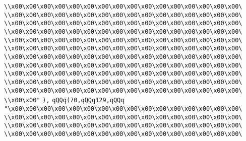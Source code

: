\verb|\\x00\x00\x00\x00\x00\x00\x00\x00\x00\x00\x00\x00\x00\x00\x00\x00\|\newline
\verb|\\x00\x00\x00\x00\x00\x00\x00\x00\x00\x00\x00\x00\x00\x00\x00\x00\|\newline
\verb|\\x00\x00\x00\x00\x00\x00\x00\x00\x00\x00\x00\x00\x00\x00\x00\x00\|\newline
\verb|\\x00\x00\x00\x00\x00\x00\x00\x00\x00\x00\x00\x00\x00\x00\x00\x00\|\newline
\verb|\\x00\x00\x00\x00\x00\x00\x00\x00\x00\x00\x00\x00\x00\x00\x00\x00\|\newline
\verb|\\x00\x00\x00\x00\x00\x00\x00\x00\x00\x00\x00\x00\x00\x00\x00\x00\|\newline
\verb|\\x00\x00\x00\x00\x00\x00\x00\x00\x00\x00\x00\x00\x00\x00\x00\x00\|\newline
\verb|\\x00\x00\x00\x00\x00\x00\x00\x00\x00\x00\x00\x00\x00\x00\x00\x00\|\newline
\verb|\\x00\x00\x00\x00\x00\x00\x00\x00\x00\x00\x00\x00\x00\x00\x00\x00\|\newline
\verb|\\x00\x00\x00\x00\x00\x00\x00\x00\x00\x00\x00\x00\x00\x00\x00\x00\|\newline
\verb|\\x00\x00\x00\x00\x00\x00\x00\x00\x00\x00\x00\x00\x00\x00\x00\x00\|\newline
\verb|\\x00\x00"|\newline
\verb|),|\newline
\verb|qQQq(70,qQQq129,qQQq|\newline
\verb|"\x00\x00\x00\x00\x00\x00\x00\x00\x00\x00\x00\x00\x00\x00\x00\x00\|\newline
\verb|\\x00\x00\x00\x00\x00\x00\x00\x00\x00\x00\x00\x00\x00\x00\x00\x00\|\newline
\verb|\\x00\x00\x00\x00\x00\x00\x00\x00\x00\x00\x00\x00\x00\x00\x00\x00\|\newline
\verb|\\x00\x00\x00\x00\x00\x00\x00\x00\x00\x00\x00\x00\x00\x00\x00\x00\|\newline
